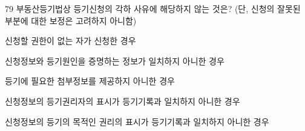 \begin{question}{79}
부동산등기법상 등기신청의 각하 사유에 해당하지 않는 것은? (단, 신청의 잘못된 부분에 대한 보정은 고려하지 아니함)
\begin{choices}
  \item 신청할 권한이 없는 자가 신청한 경우
  \item 신청정보와 등기원인을 증명하는 정보가 일치하지 아니한 경우
  \item 등기에 필요한 첨부정보를 제공하지 아니한 경우
  \item 신청정보의 등기권리자의 표시가 등기기록과 일치하지 아니한 경우
  \item 신청정보의 등기의 목적인 권리의 표시가 등기기록과 일치하지 아니한 경우
\end{choices}
\end{question}
